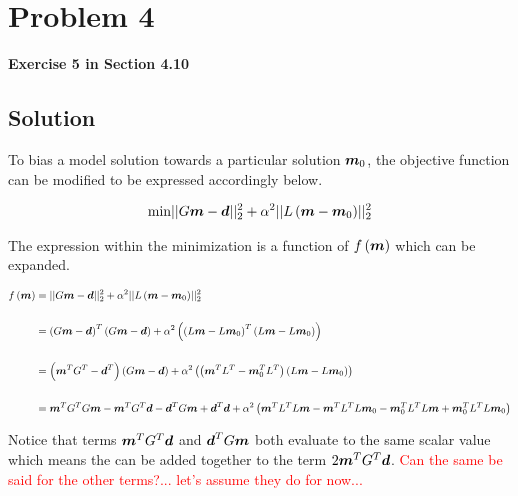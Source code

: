 
\begingroup
\allowdisplaybreaks

\newpage
\section{Problem 4}

\textbf{Exercise 5 in Section 4.10}

\subsection{Solution}

To bias a model solution towards a particular solution $\boldsymbol{m}_0$, the objective function can be modified to be expressed accordingly below.

\begin{align*}
	\textrm{min} || {G \boldsymbol{m} - \boldsymbol{d}} ||_2^2 + \alpha^2 || {L \left(\boldsymbol{m} - \boldsymbol{m}_0 \right) } ||_2^2
\end{align*}

The expression within the minimization is a function of $f \left( \boldsymbol{m} \right)$ which can be expanded.

\begin{align*}
	f \left( \boldsymbol{m} \right) &= || {G \boldsymbol{m} - \boldsymbol{d}} ||_2^2 + \alpha^2 || {L \left(\boldsymbol{m} - \boldsymbol{m}_0 \right) } ||_2^2 \\
	\\
	&= \left(G \boldsymbol{m} - \boldsymbol{d} \right)^T \left(G \boldsymbol{m} - \boldsymbol{d} \right) + \alpha^2 \left( \left( L \boldsymbol{m} - L \boldsymbol{m}_0 \right)^T \left( L \boldsymbol{m} - L \boldsymbol{m}_0 \right) \right) \\
	\\
	&= \left(\boldsymbol{m}^T G^T - \boldsymbol{d}^T \right) \left(G \boldsymbol{m} - \boldsymbol{d} \right) + \alpha^2 \left( \left( \boldsymbol{m}^T L^T - \boldsymbol{m}_0^T L^T \right) \left( L \boldsymbol{m} - L \boldsymbol{m}_0 \right) \right) \\
	\\
	&= \boldsymbol{m}^T G^T G \boldsymbol{m} - \boldsymbol{m}^T G^T \boldsymbol{d} - \boldsymbol{d}^T G \boldsymbol{m} + \boldsymbol{d}^T \boldsymbol{d} + \alpha^2 \left( \boldsymbol{m}^T L^T L \boldsymbol{m} - \boldsymbol{m}^T L^T L \boldsymbol{m}_0 - \boldsymbol{m}_0^T L^T L \boldsymbol{m} + \boldsymbol{m}_0^T L^T L \boldsymbol{m}_0 \right)
\end{align*}

Notice that terms $\boldsymbol{m}^T G^T \boldsymbol{d}$ and $\boldsymbol{d}^T G \boldsymbol{m}$ both evaluate to the same scalar value which means the can be added together to the term $2 \boldsymbol{m}^T G^T \boldsymbol{d}$. \textcolor{red}{Can the same be said for the other terms?... let's assume they do for now...}

